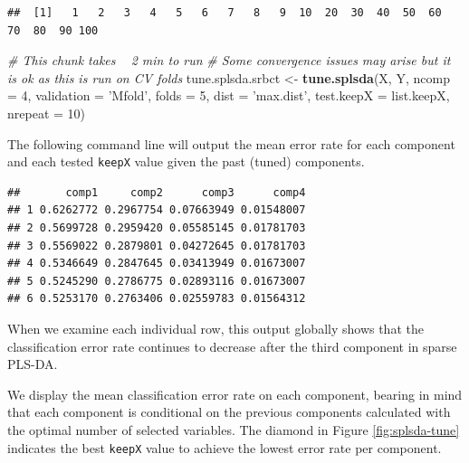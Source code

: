 \documentclass[]{book}
\newenvironment{Shaded}{\begin{snugshade}}{\end{snugshade}}
\newcommand{\CommentTok}[1]{\textcolor[rgb]{0.56,0.35,0.01}{\textit{#1}}}
\newcommand{\DataTypeTok}[1]{\textcolor[rgb]{0.13,0.29,0.53}{#1}}
\newcommand{\DecValTok}[1]{\textcolor[rgb]{0.00,0.00,0.81}{#1}}
\newcommand{\KeywordTok}[1]{\textcolor[rgb]{0.13,0.29,0.53}{\textbf{#1}}}
\newcommand{\NormalTok}[1]{#1}
\newcommand{\OperatorTok}[1]{\textcolor[rgb]{0.81,0.36,0.00}{\textbf{#1}}}
\newcommand{\StringTok}[1]{\textcolor[rgb]{0.31,0.60,0.02}{#1}}
\begin{document}
\begin{verbatim}
##  [1]   1   2   3   4   5   6   7   8   9  10  20  30  40  50  60  70  80  90 100
\end{verbatim}

\begin{Shaded}
\begin{Highlighting}[]
\CommentTok{# This chunk takes ~ 2 min to run}
\CommentTok{# Some convergence issues may arise but it is ok as this is run on CV folds}
\NormalTok{tune.splsda.srbct <-}\StringTok{ }\KeywordTok{tune.splsda}\NormalTok{(X, Y, }\DataTypeTok{ncomp =} \DecValTok{4}\NormalTok{, }\DataTypeTok{validation =} \StringTok{'Mfold'}\NormalTok{, }
                                 \DataTypeTok{folds =} \DecValTok{5}\NormalTok{, }\DataTypeTok{dist =} \StringTok{'max.dist'}\NormalTok{, }
                                 \DataTypeTok{test.keepX =}\NormalTok{ list.keepX, }\DataTypeTok{nrepeat =} \DecValTok{10}\NormalTok{)}
\end{Highlighting}
\end{Shaded}

The following command line will output the mean error rate for each component and each tested \texttt{keepX} value given the past (tuned) components.

\begin{Shaded}
\end{Shaded}

\begin{verbatim}
##       comp1     comp2      comp3      comp4
## 1 0.6262772 0.2967754 0.07663949 0.01548007
## 2 0.5699728 0.2959420 0.05585145 0.01781703
## 3 0.5569022 0.2879801 0.04272645 0.01781703
## 4 0.5346649 0.2847645 0.03413949 0.01673007
## 5 0.5245290 0.2786775 0.02893116 0.01673007
## 6 0.5253170 0.2763406 0.02559783 0.01564312
\end{verbatim}

When we examine each individual row, this output globally shows that the classification error rate continues to decrease after the third component in sparse PLS-DA.

We display the mean classification error rate on each component, bearing in mind that each component is conditional on the previous components calculated with the optimal number of selected variables. The diamond in Figure \ref{fig:splsda-tune} indicates the best \texttt{keepX} value to achieve the lowest error rate per component.
\end{document}

